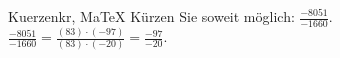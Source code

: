 \begin{MAufgabe}{Kuerzen}{kr, MaTeX}
K\"urzen Sie soweit m\"oglich: $\frac{-8051}{-1660}$.\\ 
\ifLsg\MLoesung
\quad $\frac{-8051}{-1660}=\frac{(83)\cdot(-97)}{(83)\cdot(-20)}=\frac{-97}{-20}$.\else\relax\fi
 \end{MAufgabe}